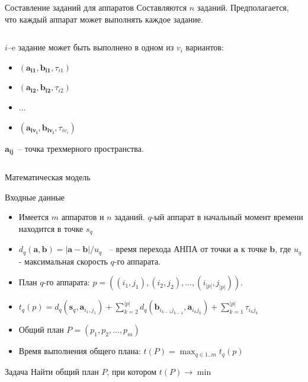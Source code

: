 \documentclass{beamer}
\begin{document}
\begin{frame}{Составление заданий для аппаратов}
Составляются $n$ заданий. Предполагается, что каждый аппарат может выполнять каждое задание.
\begin{columns}[onlytextwidth, t]
    \begin{column}{0.6\textwidth}

        $i$--e задание может быть выполнено в одном из $v_i$ вариантов:
        \begin{itemize}
        \item $(\mathbf{a_{i 1}}, \mathbf{b_{i 1}}, \tau_{i 1})$
        \item $(\mathbf{a_{i 2}}, \mathbf{b_{i 2}}, \tau_{i 2})$
        \item $...$
        \item $(\mathbf{a_{i v_i}}, \mathbf{b_{i v_i}}, \tau_{i v_i})$
        \end{itemize}
        $\mathbf{a_{i j}}$~-- точка трехмерного пространства.
    \end{column}
    \begin{column}{0.4\textwidth}

    \end{column}

​\end{columns}
\end{frame}

\begin{frame}{Математическая модель}


\begin{block}{Входные данные}
\begin{itemize}
\item Имеется $m$ аппаратов и $n$ заданий. $q$-ый аппарат в начальный момент времени находится в точке $s_q$
\item $d_q(\mathbf{a}, \mathbf{b}) = |\mathbf{a} - \mathbf{b}| / u_q$ ~-- время перехода АНПА от точки $\mathbf{a}$ к точке $\mathbf{b}$, где $u_q$ - максимальная скорость $q$-го аппарата.
\end{itemize}
\end{block}

\begin{itemize}

\item План $q$-го аппарата: $p = ((i_1, j_1), (i_2, j_2), ..., (i_{|p|}, j_{|p|}))$.

\item
$
t_q(p) = d_q(\mathbf{s}_q, \mathbf{a}_{i_1, j_1}) + \displaystyle\sum_{k=2}^{|p|} d_q(\mathbf{b}_{i_{k-1} j_{k - 1}}, \mathbf{a}_{i_k j_k}) + \displaystyle\sum_{k=1}^{|p|}\tau_{i_k j_k}
$

\item Общий план $P = (p_1, p_2, ..., p_m)$
\item Время выполнения общего плана: $t(P) = \displaystyle \max_{q \in 1..m} t_q(p)$

\end{itemize}

\begin{block}{Задача}
Найти общий план $P$, при котором $t(P) \rightarrow \min$
\end{block}

\end{frame}
\end{document}

